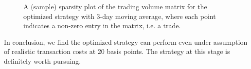 \documentclass[11pt]{article}
\theoremstyle{definition}
\begin{document}
\begin{figure}[h]
\begin{center}
\end{center}
\centering
\caption{\label{fg:spy_volume_opt}
A (sample) sparsity plot of the trading volume matrix
for the optimized strategy with 3-day moving average,
where each point indicates a non-zero entry
in the matrix, i.e. a trade.
}
\end{figure}

In conclusion, we find the optimized strategy 
can perform even under assumption of realistic 
transaction costs at 20 basis points.
The strategy at this stage is definitely 
worth pursuing.
\end{document}
